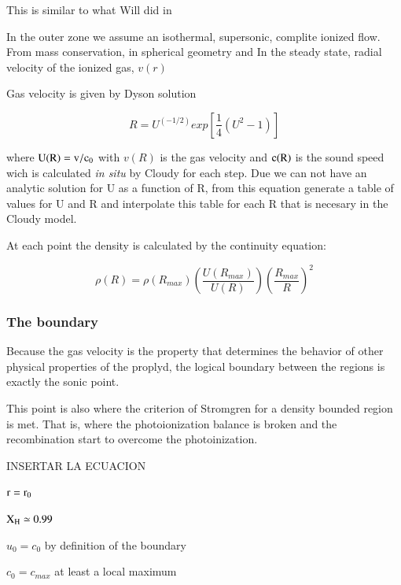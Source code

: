 \documentclass[aaspp]{article}
\begin{document}
This is similar to what Will did in \citep{2002ApJ...566..315H}

In the outer zone we assume an isothermal, supersonic, complite ionized flow. From mass conservation, in spherical geometry and In the steady state, radial velocity of the ionized gas, $v(r)$

Gas velocity is given by Dyson solution \citep{1968Ap&SS...1..388D}

\begin{equation}
  R = U^{(-1/2)} exp \left [ \frac{1}{4} \left (U^2 -1 \right )
  \right ]
\end{equation}

where $\rm U(R) = v / c_0$ with $v(R)$ is the gas velocity and $\rm c(R)$ is the sound speed wich is calculated {\it in situ} by Cloudy for each step. Due we can not have an analytic solution for U as a function of R, from this equation generate a table of values for U and R and interpolate this table for each R that is necesary in the Cloudy model.

At each point the density is calculated by the continuity equation:

\begin{equation}
  \rho (R) = \rho (R_{max}) \left ( \frac{U(R_{max})}{U (R)} \right )
    \left ( \frac{R_{max}}{R} \right ) ^2
\end{equation}

\subsubsection{The boundary}
\label{sec:boundary}

Because the gas velocity is the property that determines the behavior of other physical properties of the proplyd, the logical boundary between the regions is exactly the sonic point.

This point is also where the criterion of Stromgren for a density bounded region is met. That is, where the photoionization balance is broken and the recombination start to overcome the photoinization.

INSERTAR LA ECUACION

$\rm r = r_0$

$\rm X_H \simeq 0.99$

$u_0 = c_0$ by definition of the boundary

$c_0 = c_{max}$ at least a local maximum 
\end{document}
